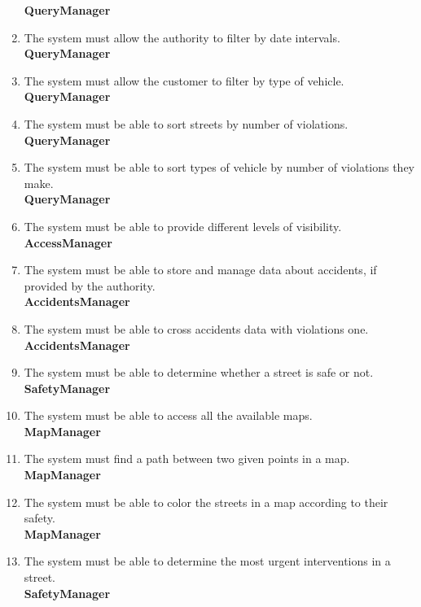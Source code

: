 \begin{enumerate}[label=\textbf{R\arabic*}]
		\textbf{QueryManager}
		\item \label{req:dateFilter} The system must allow the authority to filter by date intervals.\\
		\textbf{QueryManager}
		\item \label{req:vehicleFilter} The system must allow the customer to filter by type of vehicle.\\
		\textbf{QueryManager}
		\item \label{req:sortedResult} The system must be able to sort streets by number of violations.\\
		\textbf{QueryManager}
		\item \label{req:sortedVehicles} The system must be able to sort types of vehicle by number of violations they make.\\
		\textbf{QueryManager}
		\item \label{req:visibility} The system must be able to provide different levels of visibility.\\
		\textbf{AccessManager}
		\item \label{req:accidentsData} The system must be able to store and manage data about accidents, if provided by the authority.\\
		\textbf{AccidentsManager}
		\item \label{req:crossData} The system must be able to cross accidents data with violations one.\\
		\textbf{AccidentsManager}
		\item \label{req:safeStreet} The system must be able to determine whether a street is safe or not.\\
		\textbf{SafetyManager}
		\item \label{req:cityStreets} The system must be able to access all the available maps.\\
		\textbf{MapManager}
		\item \label{req:pathFinder} The system must find a path between two given points in a map.\\
		\textbf{MapManager}
		\item \label{req:colorMap} The system must be able to color the streets in a map according to their safety.\\
		\textbf{MapManager}
		\item \label{req:interventions} The system must be able to determine the most urgent interventions in a street.	\\
		\textbf{SafetyManager}
	\end{enumerate}